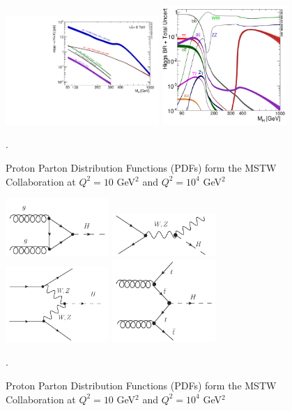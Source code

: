 \begin{figure}[!t]
\centering 
\includegraphics[width=0.52\textwidth]{figs/Higgs_XS_8TeV_lx.pdf}
\includegraphics[width=0.42\textwidth]{figs/Higgs_BR.pdf}
\caption {Proton Parton Distribution Functions (PDFs) form the MSTW Collaboration at $Q^2 = 10$ GeV$^2$ and $Q^2 = 10^4$ GeV$^2$}.
\label{figure:theory_xsec}
\end{figure}

\begin{figure}[!t]
\centering 
\includegraphics[width=0.35\textwidth]{figs/ggF.pdf}
\includegraphics[width=0.35\textwidth]{figs/vh.pdf}
\includegraphics[width=0.35\textwidth]{figs/vbf.pdf}
\includegraphics[width=0.35\textwidth]{figs/tth.pdf}
\caption {Proton Parton Distribution Functions (PDFs) form the MSTW Collaboration at $Q^2 = 10$ GeV$^2$ and $Q^2 = 10^4$ GeV$^2$}.
\label{figure:theory_higgsdiagrams}
\end{figure}



